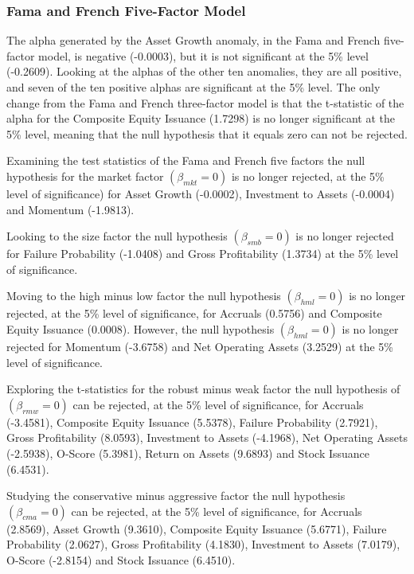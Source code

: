 \documentclass[12pt, a4paper, oneside]{article}
\begin{document}
\subsubsection{Fama and French Five-Factor Model}
The alpha generated by the Asset Growth anomaly, in the Fama and French five-factor model, is negative (-0.0003), but it is not significant at the 5\% level (-0.2609). Looking at the alphas of the other ten anomalies, they are all positive, and seven of the ten positive alphas are significant at the 5\% level. The only change from the Fama and French three-factor model is that the t-statistic of the alpha for the Composite Equity Issuance (1.7298) is no longer significant at the 5\% level, meaning that the null hypothesis that it equals zero can not be rejected.

Examining the test statistics of the Fama and French five factors the null hypothesis for the market factor $(\beta_{mkt}= 0)$ is no longer rejected, at the 5\% level of significance) for Asset Growth (-0.0002), Investment to Assets (-0.0004) and Momentum (-1.9813). 

Looking to the size factor the null hypothesis $(\beta_{smb}= 0)$ is no longer rejected for Failure Probability (-1.0408) and Gross Profitability (1.3734) at the 5\% level of significance.

Moving to the high minus low factor the null hypothesis $(\beta_{hml}= 0)$ is no longer rejected, at the 5\% level of significance, for Accruals (0.5756) and Composite Equity Issuance (0.0008). However, the null hypothesis $(\beta_{hml}= 0)$ is no longer rejected for Momentum (-3.6758) and Net Operating Assets (3.2529) at the 5\% level of significance.

Exploring the t-statistics for the robust minus weak factor the null hypothesis of $(\beta_{rmw}= 0)$ can be rejected, at the 5\% level of significance, for Accruals (-3.4581), Composite Equity Issuance (5.5378), Failure Probability (2.7921), Gross Profitability (8.0593), Investment to Assets (-4.1968), Net Operating Assets (-2.5938), O-Score (5.3981), Return on Assets (9.6893) and Stock Issuance (6.4531).

Studying the conservative minus aggressive factor the null hypothesis $(\beta_{cma}= 0)$ can be rejected, at the 5\% level of significance, for Accruals (2.8569), Asset Growth (9.3610), Composite Equity Issuance (5.6771), Failure Probability (2.0627), Gross Profitability (4.1830), Investment to Assets (7.0179), O-Score (-2.8154) and Stock Issuance (6.4510).
\end{document}
